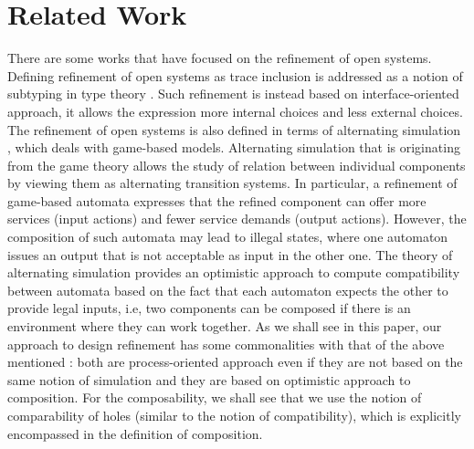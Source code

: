 \documentclass[runningheads]{llncs}
\begin{document}



%
%
%
%

\section{Related Work}
\label{sec:sota}



There are some works that have focused on  the refinement of open systems. Defining refinement of open systems as trace inclusion  is  addressed  as a notion of subtyping in type theory 
\cite{GayH:2005,BravettiZ:2021}. Such refinement is  instead based  on interface-oriented approach, it allows the expression more internal choices and less external choices. The refinement of open systems is also defined in terms of  alternating simulation \cite{Alur:1998,deAlfaro:2021}, which deals with game-based models.
Alternating simulation that is originating from the game theory \cite{deAlfaro:2003} allows  the study of relation between individual components by viewing them as alternating transition systems. In particular,  a refinement of game-based automata expresses that the refined component can offer more services (input actions) and fewer service demands (output actions). However, the composition of such automata may
lead to illegal states, where one automaton issues an output that is not acceptable as input in the other one. The theory of alternating simulation provides an optimistic approach to compute compatibility between automata based on the fact that each automaton expects the other to provide  legal inputs, i.e, two components can be composed if there is an environment where they can work together. As we shall see in this paper, 
our approach to design refinement  has some commonalities with that of the above mentioned \cite{deAlfaro:2021}: both are process-oriented approach even if they are not based on the same notion of simulation and they are based on optimistic approach to composition. 
For the composability, we shall see that we use the notion of comparability of holes (similar to the notion of compatibility), which is explicitly encompassed in the definition of composition.
\end{document}
